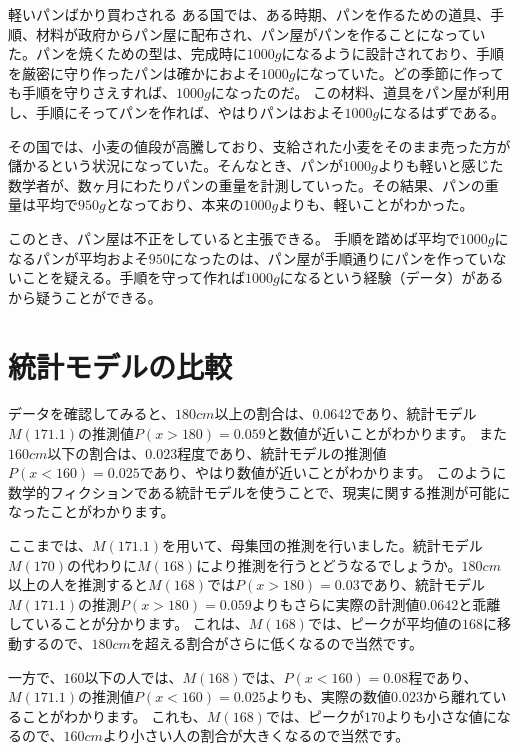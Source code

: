 \begin{SMbox}{軽いパンばかり買わされる}
ある国では、ある時期、パンを作るための道具、手順、材料が政府からパン屋に配布され、パン屋がパンを作ることになっていた。パンを焼くための型は、完成時に$1000g$になるように設計されており、手順を厳密に守り作ったパンは確かにおよそ$1000g$になっていた。どの季節に作っても手順を守りさえすれば、$1000g$になったのだ。
この材料、道具をパン屋が利用し、手順にそってパンを作れば、やはりパンはおよそ$1000g$になるはずである。

その国では、小麦の値段が高騰しており、支給された小麦をそのまま売った方が儲かるという状況になっていた。そんなとき、パンが$1000g$よりも軽いと感じた数学者が、数ヶ月にわたりパンの重量を計測していった。その結果、パンの重量は平均で$950g$となっており、本来の$1000g$よりも、軽いことがわかった。

このとき、パン屋は不正をしていると主張できる。
手順を踏めば平均で$1000g$になるパンが平均およそ$950$になったのは、パン屋が手順通りにパンを作っていないことを疑える。手順を守って作れば$1000g$になるという経験（データ）があるから疑うことができる。
\end{SMbox}


\section{統計モデルの比較}
データを確認してみると、$180cm$以上の割合は、0.0642であり、統計モデル$M(171.1)$の推測値$P(x>180)=0.059$と数値が近いことがわかります。
また$160cm$以下の割合は、$0.023$程度であり、統計モデルの推測値$P(x<160)=0.025$であり、やはり数値が近いことがわかります。
このように数学的フィクションである統計モデルを使うことで、現実に関する推測が可能になったことがわかります。


ここまでは、$M(171.1)$を用いて、母集団の推測を行いました。統計モデル$M(170)$の代わりに$M(168)$により推測を行うとどうなるでしょうか。$180cm$以上の人を推測すると$M(168)$では$P(x>180)=0.03$であり、統計モデル$M(171.1)$の推測$P(x>180)=0.059$よりもさらに実際の計測値$0.0642$と乖離していることが分かります。
これは、$M(168)$では、ピークが平均値の$168$に移動するので、$180cm$を超える割合がさらに低くなるので当然です。

一方で、$160$以下の人では、$M(168)$では、$P(x<160)=0.08$程であり、$M(171.1)$の推測値$P(x<160)=0.025$よりも、実際の数値$0.023$から離れていることがわかります。
これも、$M(168)$では、ピークが$170$よりも小さな値になるので、$160cm$より小さい人の割合が大きくなるので当然です。


